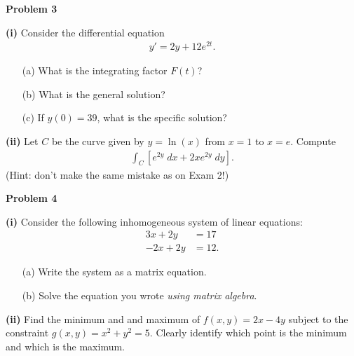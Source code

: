 \documentclass[12pt]{amsbook}
\begin{document}
\newpage

\textbf{Problem 3}

\vspace{.25cm}

\textbf{(i)} Consider the differential equation
\begin{align*}
y' = 2y+12e^{2t}.
\end{align*}
\begin{itemize}
\item[(a)] What is the integrating factor $F(t)$?
\item[(b)] What is the general solution?
\item[(c)] If $y(0) = 39$, what is the specific solution?
\end{itemize}


\vspace{10cm}

\textbf{(ii)} Let $C$ be the curve given by  $y=\ln(x)$ from $x=1$ to $x=e$. Compute
\begin{align*}
\int_C \left[e^{2y} \; dx + 2xe^{2y} \; dy\right].
\end{align*}
(Hint: don't make the same mistake as on Exam 2!)



\newpage

\textbf{Problem 4}

\vspace{.25cm}

\textbf{(i)} Consider the following inhomogeneous system of linear equations:
\begin{align*}
3x+2y &= 17 \\
-2x+2y &= 12.
\end{align*}
\begin{itemize}
\item[(a)] Write the system as a matrix equation.
\item[(b)] Solve the equation you wrote \emph{using matrix algebra}.
\end{itemize}

\vspace{9cm}

\textbf{(ii)} Find the minimum and and maximum of $f(x,y) = 2x-4y$ subject to the constraint $g(x,y) = x^2+y^2 = 5$. Clearly identify which point is the minimum and which is the maximum.









\newpage
\end{document}
